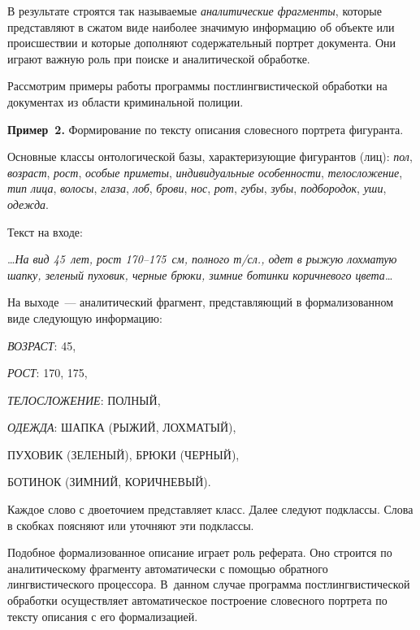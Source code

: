\begin{multicols}{2}
    В результате строятся так называемые \textit{аналитические 
фрагменты}, которые представляют в сжатом виде наиболее значимую 
информацию об объекте или происшествии и которые дополняют 
содержательный портрет документа. Они играют важную роль при поиске и 
аналитической обработке.
    
    Рассмотрим примеры работы программы постлингвистической обработки 
на документах из об\-ласти криминальной полиции.
    
    \medskip
    
    \noindent
    \textbf{Пример~2.} Формирование по тексту описания словесного 
портрета фигуранта.
    
    Основные классы онтологической базы, характеризующие фигурантов 
(лиц): \textit{пол}, \textit{возраст}, \textit{рост}, \textit{особые приметы}, 
\textit{индивидуальные особенности}, \textit{телосложение}, \textit{тип лица}, 
\textit{волосы}, \textit{глаза}, \textit{лоб}, \textit{брови}, \textit{нос}, \textit{рот}, 
\textit{губы}, \textit{зубы}, \textit{подбородок}, \textit{уши}, \textit{одежда}.
    
    Текст на входе:
    
    \ldots\textit{На вид 45~лет, рост 170--175~см, полного т/сл., одет в 
рыжую лохматую шапку, зеленый пуховик, черные брюки, зимние ботинки 
коричневого цвета}\ldots
    
    На выходе~--- аналитический фрагмент, представляющий в 
формализованном виде следующую информацию:

\smallskip
     
{\footnotesize

\noindent
     \textit{ВОЗРАСТ}: 45,
     
\noindent
     \textit{РОСТ}: 170, 175,
     
\noindent
     \textit{ТЕЛОСЛОЖЕНИЕ}: ПОЛНЫЙ,
     
\noindent
\textit{ОДЕЖДА}: ШАПКА (РЫЖИЙ, ЛОХМАТЫЙ),

\noindent ПУХОВИК (ЗЕЛЕНЫЙ), БРЮКИ (ЧЕРНЫЙ),

\noindent 
БОТИНОК (ЗИМНИЙ, КОРИЧНЕВЫЙ).

}

\smallskip
     
    Каждое слово с двоеточием представляет класс. Далее следуют подклассы. 
Слова в скобках поясняют или уточняют эти подклассы.
    
    Подобное формализованное описание играет роль реферата. Оно строится 
по аналитическому фрагменту автоматически с помощью обратного 
лингвистического процессора. В~данном случае программа 
постлингвистической обработки осуществляет автоматическое построение 
словесного портрета по тексту описания с его формализацией.
    

\end{multicols}
